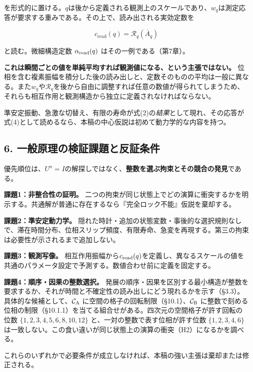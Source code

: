\documentclass[
  a4paper,
]{ltjsarticle}
\begin{document}
を形式的に置ける。\(q\)は後から定義される観測上のスケールであり、\(w_q\)は測定応答が要求する重みである。その上で、読み出される実効定数を

\[
c_{\mathrm{read}}(q)=\mathcal R_q(\overline A_q)
\tag{4}
\]

と読む。微細構造定数 \(\alpha_{\rm read}(q)\)
はその一例である（第7章）。

\textbf{これは瞬間ごとの値を単純平均すれば観測値になる、という主張ではない。}
位相を含む複素振幅を積分した後の読み出しと、定数そのものの平均は一般に異なる。また\(w_q\)や\(\mathcal R_q\)を後から自由に調整すれば任意の数値が得られてしまうため、それらも相互作用と観測構造から独立に定義されなければならない。

準安定振動、急激な切替え、有限の寿命が式(2)の\emph{結果}として現れ、その応答が式(4)として読めるなら、本稿の中心仮説は初めて動力学的な内容を持つ。

\subsection{6.
一般原理の検証課題と反証条件}\label{ux4e00ux822cux539fux7406ux306eux691cux8a3cux8ab2ux984cux3068ux53cdux8a3cux6761ux4ef6}

優先順位は、\(U^n=I\)の解探しではなく、\textbf{整数を選ぶ拘束とその競合の発見}である。

\textbf{課題1：非整合性の証明。}
二つの拘束が同じ状態上でどの演算に衝突するかを明示する。共通解が普通に存在するなら『完全ロック不能』仮説を棄却する。

\textbf{課題2：準安定動力学。}
隠れた時計・追加の状態変数・事後的な選択規則なしで、滞在時間分布、位相スリップ頻度、有限寿命、急変を再現する。第三の拘束は必要性が示されるまで追加しない。

\textbf{課題3：観測写像。}
相互作用振幅から\(c_{\rm read}(q)\)を定義し、異なるスケールの値を共通のパラメータ設定で予測する。数値合わせ前に定義を固定する。

\textbf{課題4：順序・因果の整数選択。}
発展の順序・因果を区別する最小構造が整数を要求するか、それが時間と不確定性の読み出しにどう現れるかを示す（§3.3）。具体的な候補として、\(\mathcal C_{\rm A}\)
に空間の格子の回転制限（§10.1）、\(\mathcal C_{\rm B}\)
に整数で刻める位相の制限（§10.1.1）を当てる組合せがある。四次元の空間格子が許す回転の位数
\(\{1,2,3,4,5,6,8,10,12\}\) と、一対の整数で表す位相が許す位数
\(\{1,2,3,4,6\}\)
は一致しない。この食い違いが同じ状態上の演算の衝突（H2）になるかを調べる。

これらのいずれかで必要条件が成立しなければ、本稿の強い主張は棄却または修正される。
\end{document}
